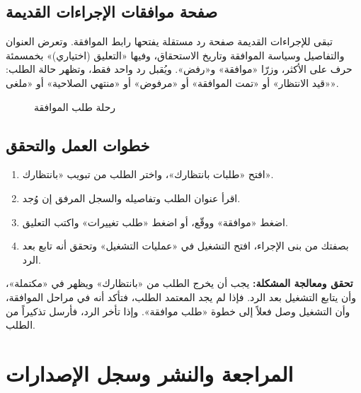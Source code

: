 \subsection{صفحة موافقات الإجراءات القديمة}

تبقى للإجراءات القديمة صفحة رد مستقلة يفتحها رابط الموافقة. وتعرض العنوان والتفاصيل وسياسة الموافقة وتاريخ الاستحقاق، وفيها «التعليق (اختياري)» بخمسمئة حرف على الأكثر، وزرّا «موافقة» و«رفض». ويُقبل رد واحد فقط، وتظهر حالة الطلب: «قيد الانتظار» أو «تمت الموافقة» أو «مرفوض» أو «منتهي الصلاحية» أو «ملغى».

\begin{figure}[H]
\centering
{}
\rclegend
\caption{رحلة طلب الموافقة}
\label{fig:builder-isop-approvals-flow}
\end{figure}

\subsection{خطوات العمل والتحقق}
\begin{enumerate}
\item افتح «طلبات بانتظارك»، واختر الطلب من تبويب «بانتظارك».
\item اقرأ عنوان الطلب وتفاصيله والسجل المرفق إن وُجد.
\item اضغط «موافقة» ووقّع، أو اضغط «طلب تغييرات» واكتب التعليق.
\item بصفتك من بنى الإجراء، افتح التشغيل في «عمليات التشغيل» وتحقق أنه تابع بعد الرد.
\end{enumerate}

\textbf{تحقق ومعالجة المشكلة:} يجب أن يخرج الطلب من «بانتظارك» ويظهر في «مكتملة»، وأن يتابع التشغيل بعد الرد. فإذا لم يجد المعتمد الطلب، فتأكد أنه في مراحل الموافقة، وأن التشغيل وصل فعلاً إلى خطوة «طلب موافقة». وإذا تأخر الرد، فأرسل تذكيراً من الطلب.

\clearpage
\section{المراجعة والنشر وسجل الإصدارات}
\label{sec:builder-feature-isop-publish}

